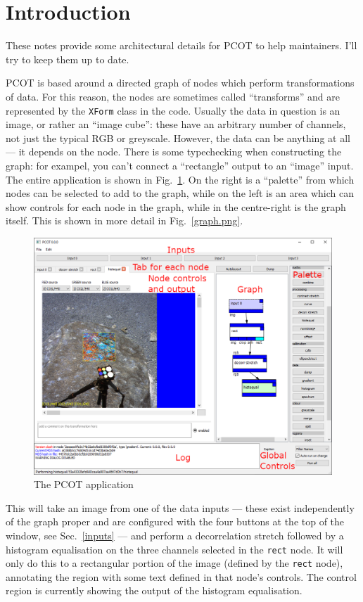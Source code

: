 

\section{Introduction}
These notes provide some architectural details for PCOT to help
maintainers. I'll try to keep them up to date.

PCOT is based around a directed graph of nodes which perform
transformations of data. For this reason, the nodes are sometimes
called ``transforms'' and are represented by the \texttt{XForm} class
in the code.
Usually the data in question is an image, or rather an ``image cube'':
these have an arbitrary number of channels, not just the typical
RGB or greyscale. However, the data can be anything at all --- it depends
on the node. There is some typechecking when constructing the graph:
for exampel, you can't connect a ``rectangle'' output to an ``image'' input.
The entire application is shown in Fig.~\ref{app.png}. On the right
is a ``palette'' from which nodes can be selected to add to the graph,
while on the left
is an area which can show controls for each node in the graph, while
in the centre-right is the graph itself. This is shown in more detail
in Fig.~\ref{graph.png}.

\begin{figure}[ht]
\center
\includegraphics[width=6in]{app.png}
\caption{The PCOT application}
\label{app.png}
\end{figure}

\clearpage This will take an image from one of the data inputs --- these
exist independently of the graph proper and are configured with the four buttons
at the top of the window, see Sec.~\ref{inputs} ---
and perform a decorrelation stretch followed by a histogram
equalisation on the three channels selected in the \texttt{rect} node.
It will only do this to a rectangular
portion of the image (defined by the \texttt{rect} node), annotating the
region with some text defined in that node's controls. The
control region is currently showing the output of the histogram equalisation.

